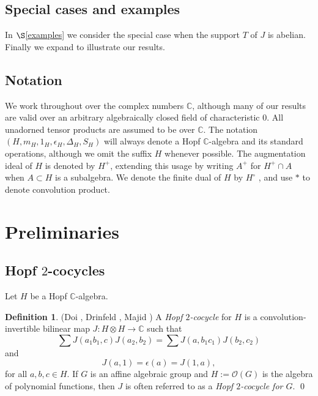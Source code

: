 \documentclass{amsart}
\numberwithin{equation}{section}
\theoremstyle{definition}
\newtheorem{definition}[theorem]{Definition}
\begin{document}
\subsection{Special cases and examples}\label{examplesintro}
In $\S$\ref{examples} we consider the special case when the support $T$ of $J$ is abelian. Finally we expand \cite[Examples 6.1-6.5]{G2} to illustrate our results. 

\subsection{Notation}\label{notation} 

We work throughout over the complex numbers $\mathbb{C}$, although many of our results are valid over an arbitrary algebraically closed field of characteristic $0$. All unadorned tensor products are assumed to be over $\mathbb{C}$. The notation $(H, m_H, 1_H, \epsilon_H, \Delta_H, S_H)$ will always denote a Hopf $\mathbb{C}$-algebra and its standard operations, although we omit the suffix $H$ whenever possible. The augmentation ideal of $H$ is denoted by $H^+$, extending this usage by writing $A^+$ for $H^+ \cap A$ when $A\subset H$ is a subalgebra. We denote the finite dual of $H$ by $H^{\circ}$ \cite[$\S$9.1]{M}, and use $\ast$ to denote convolution product.

\section{Preliminaries}\label{prelims} 

\subsection{Hopf $2$-cocycles}\label{cocycles}

Let $H$ be a Hopf $\mathbb{C}$-algebra.

\begin{definition}\label{twococyc}(Doi \cite{D}, Drinfeld \cite{Dr}, Majid \cite[$\S\S$2.1,2.2,2.3]{Ma1}) A \emph{Hopf $2$-cocycle} for $H$ is a convolution-invertible bilinear map $J: H \otimes H \rightarrow \mathbb{C}$ such that
\begin{equation}\label{Jone} \sum J(a_1b_1,c)J(a_2,b_2) = \sum J(a, b_1c_1)J(b_2,c_2)
\end{equation}
and
\begin{equation}\label{Jtwo} J(a,1)= \epsilon (a)= J(1,a),
\end{equation}
for all $a,b,c \in H$. If $G$ is an affine algebraic group and $H:=\mathcal{O}(G)$ is the algebra of polynomial functions, then $J$ is often referred to as a \emph{Hopf $2$-cocycle for $G$}. \qed
\end{definition}
\end{document}
